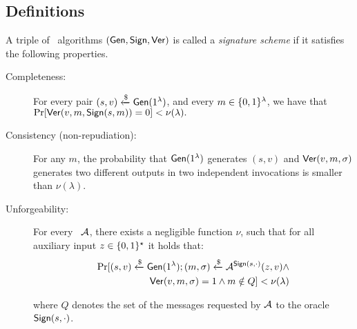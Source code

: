 \subsection{Definitions}\label{se:moredefinitions}

\begin{definition}\label{def:signature} A triple of \ppt\ algorithms $(\mathsf{Gen},\mathsf{Sign},\mathsf{Ver})$
is called a {\em signature scheme} if it satisfies the following properties.

\begin{description}

\item[Completeness:] For every pair $(s,v) \xleftarrow{\text{\$}} \mathsf{Gen}(1^\lambda)$,
    and every $m \in \{0,1\}^{\lambda}$, we have that $\Pr[\mathsf{Ver}(v, m,\mathsf{Sign}(s, m))=0]<\nu(\lambda).$
\item[Consistency (non-repudiation):] For any $m$, the probability that $\mathsf{Gen}(1^\lambda)$ generates $(s,v)$
and $\mathsf{Ver}(v,m,\sigma)$ generates two different outputs in two independent invocations is smaller than $\nu(\lambda)$.


\item[Unforgeability:] For every \ppt\ $\mathcal{A}$, there exists a negligible function $\nu$,  such that for all auxiliary input $z\in \{0,1\}^{\star}$ it holds that:
	\begin{equation*}\begin{split}
\Pr[(s,v) \xleftarrow{\text{\$}} \mathsf{Gen}(1^\lambda); (m,\sigma)\xleftarrow{\text{\$}}\mathcal{A}^{\mathsf{Sign}(s,\cdot)}(z,v) \wedge \\
  \mathsf{Ver}(v,m,\sigma)=1 \wedge m \notin Q] < \nu(\lambda)
	\end{split}\end{equation*}
	
where $Q$ denotes the set of the messages requested by $\mathcal{A}$ to the oracle $\mathsf{Sign}(s,\cdot)$.
\end{description}
 \end{definition}
 
